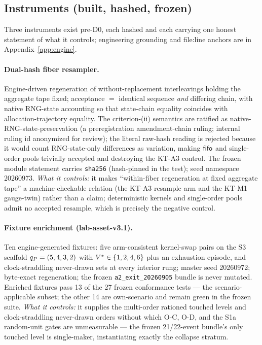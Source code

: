\subsection{Instruments (built, hashed, frozen)}
\label{sec:cube-instruments}

Three instruments exist pre-D0, each hashed and each carrying one honest
statement of what it controls; engineering grounding and file:line anchors
are in Appendix~\ref{app:engine}.

\paragraph{Dual-hash fiber resampler.}
Engine-driven regeneration of without-replacement interleavings holding the
aggregate tape fixed; acceptance $=$ identical
 sequence \emph{and} differing
 chain, with native RNG-state accounting so that
state-chain equality coincides with allocation-trajectory equality. The
criterion-(ii) semantics are ratified as native-RNG-state-preservation (a
preregistration amendment-chain ruling; internal ruling id anonymized for
review); the literal raw-hash reading is rejected because it would
count RNG-state-only differences as variation, making $\mathsf{fifo}$ and
single-order pools trivially accepted and destroying the KT-A3 control. The
frozen module statement carries \texttt{sha256} \resamplerhash{}
(hash-pinned in the test); seed namespace 20260973. \emph{What it controls:}
it makes ``within-fiber regeneration at fixed aggregate tape'' a
machine-checkable relation (the KT-A3 resample arm and the KT-M1 gauge-twin)
rather than a claim; deterministic kernels and single-order pools admit no
accepted resample, which is precisely the negative control.

\paragraph{Fixture enrichment (lab-asset-v3.1).}
Ten engine-generated fixtures: five arm-consistent kernel-swap pairs on the
S3 scaffold $q_{P} = (5,4,3,2)$ with $V^{*} \in \{1,2,4,6\}$ plus an
exhaustion episode, and clock-straddling never-drawn sets at every interior
rung; master seed 20260972; byte-exact regeneration; the frozen
\texttt{a2\_exit\_20260905} bundle is never mutated. Enriched fixtures pass
13 of the 27 frozen conformance tests --- the scenario-applicable subset; the
other 14 are own-scenario and remain green in the frozen suite.
\emph{What it controls:} it supplies the multi-order rationed touched levels
and clock-straddling never-drawn orders without which O-C, O-D, and the S1a
random-unit gates are unmeasurable --- the frozen 21/22-event bundle's only
touched level is single-maker, instantiating exactly the collapse stratum.

